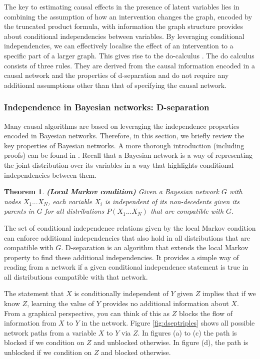 \documentclass[11pt,a4paper,twoside]{report}
\theoremstyle{plain}
\newtheorem{theorem}{Theorem}
\theoremstyle{definition}
\begin{document}
The key to estimating causal effects in the presence of latent variables lies in combining the assumption of how an intervention changes the graph, encoded by the truncated product formula, with information the graph structure provides about conditional independencies between variables. 
By leveraging conditional independencies, we can effectively localise the effect of an intervention to a specific part of a larger graph. This gives rise to the do-calculus \citep{Pearl2000}. The do calculus consists of three rules. They are derived from the causal information encoded in a causal network and the properties of d-separation and do not require any additional assumptions other than that of specifying the causal network.

\subsubsection{Independence in Bayesian networks: D-separation}
\label{sec:dsep}

Many causal algorithms are based on leveraging the independence properties encoded in Bayesian networks. Therefore, in this section, we briefly review the key properties of Bayesian networks. A more thorough introduction (including proofs) can be found in \citep{Koller2009}. Recall that a Bayesian network is a way of representing the joint distribution over its variables in a way that highlights conditional independencies between them. 

\vspace{.3cm}
\begin{theorem}
\textbf{(Local Markov condition)} Given a Bayesian network $G$ with nodes $X_{1}...X_{N}$, each variable $X_{i}$ is independent of its non-decedents given its parents in $G$ for all distributions $P(X_{1}...X_{N})$ that are compatible with $G$.
\end{theorem}

The set of conditional independence relations given by the local Markov condition can enforce additional independencies that also hold in all distributions that are compatible with $G$. D-separation is an algorithm that extends the local Markov property to find these additional independencies. It provides a simple way of reading from a network if a given conditional independence statement is true in all distributions compatible with that network.

The statement that $X$ is conditionally independent of $Y$ given $Z$ implies that if we know $Z$, learning the value of $Y$ provides no additional information about $X$. From a graphical perspective, you can think of this as $Z$ blocks the flow of information from $X$ to $Y$ in the network. Figure \ref{fig:dseptriples} shows all possible network paths from a variable $X$ to $Y$ via $Z$. In figures (a) to (c) the path is blocked if we condition on $Z$ and unblocked otherwise. In figure (d), the path is unblocked if we condition on $Z$ and blocked otherwise. 
\end{document}
